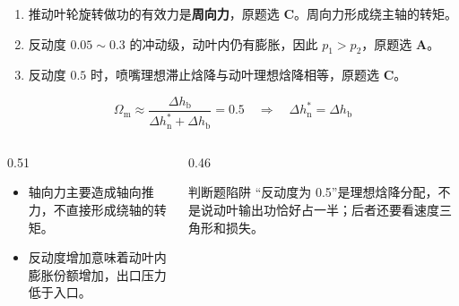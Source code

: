 \begin{frame}[t,shrink]{}
\begin{enumerate}
  \item 推动叶轮旋转做功的有效力是\textbf{周向力}，原题选 \textbf{C}。周向力形成绕主轴的转矩。
  \item 反动度 \(0.05\sim0.3\) 的冲动级，动叶内仍有膨胀，因此 \(p_1>p_2\)，原题选 \textbf{A}。
  \item 反动度 \(0.5\) 时，喷嘴理想滞止焓降与动叶理想焓降相等，原题选 \textbf{C}。
\end{enumerate}
$$
\Omega_{\mathrm{m}}\approx
\frac{\Delta h_{\mathrm{b}}}
{\Delta h_{\mathrm{n}}^*+\Delta h_{\mathrm{b}}}=0.5
\quad\Rightarrow\quad
\Delta h_{\mathrm{n}}^*=\Delta h_{\mathrm{b}}
$$
\begin{columns}[T,onlytextwidth]
\begin{column}{0.51\textwidth}
  \begin{itemize}
    \item 轴向力主要造成轴向推力，不直接形成绕轴的转矩。
    \item 反动度增加意味着动叶内膨胀份额增加，出口压力低于入口。
  \end{itemize}
\end{column}
\begin{column}{0.46\textwidth}
  \begin{amberbox}{判断题陷阱}
  \small “反动度为 0.5”是理想焓降分配，不是说动叶输出功恰好占一半；后者还要看速度三角形和损失。
  \end{amberbox}
\end{column}
\end{columns}
\end{frame}

